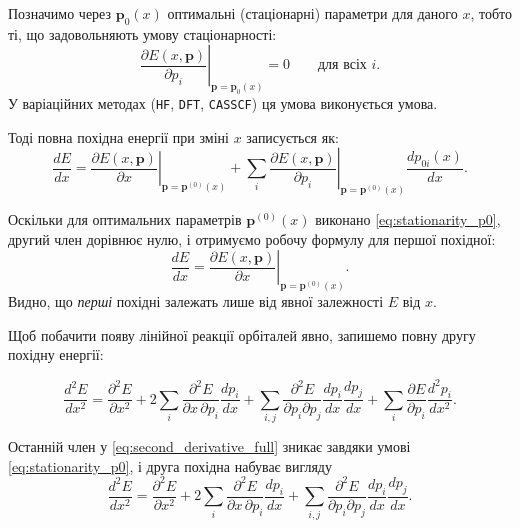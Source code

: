 \documentclass{PySCFBook}
\begin{document}
Позначимо через \(\mathbf p_0(x)\) оптимальні (стаціонарні) параметри для даного \(x\),
тобто ті, що задовольняють умову стаціонарності:
\begin{equation}
\left.\frac{\partial E(x,\mathbf p)}{\partial p_i}\right|_{\mathbf p=\mathbf p_0(x)} = 0
\qquad\text{для всіх }i.
\label{eq:stationarity_p0}
\end{equation}
У варіаційних методах (\texttt{HF}, \texttt{DFT}, \texttt{CASSCF})
ця умова виконується умова.


Тоді повна похідна енергії при зміні \(x\) записується як:
\begin{equation}
\frac{dE}{dx}
=
\left.\frac{\partial E(x,\mathbf p)}{\partial x}\right|_{\mathbf p=\mathbf p^{(0)}(x)}
+
\sum_i
\left.\frac{\partial E(x,\mathbf p)}{\partial p_i}\right|_{\mathbf p=\mathbf p^{(0)}(x)}
\frac{d p_{0i}(x)}{dx}.
\label{eq:dE_dx_general}
\end{equation}

Оскільки для оптимальних параметрів \(\mathbf p^{(0)}(x)\) виконано \eqref{eq:stationarity_p0},
другий член дорівнює нулю, і отримуємо робочу формулу для першої похідної:
\begin{equation}
\frac{dE}{dx}
=
\left.\frac{\partial E(x,\mathbf p)}{\partial x}\right|_{\mathbf p=\mathbf p^{(0)}(x)}.
\label{eq:dE_dx_stationary}
\end{equation}
Видно, що \emph{перші} похідні залежать лише від явної залежності $E$ від $x$.


Щоб побачити появу лінійної реакції орбіталей явно,
запишемо повну другу похідну енергії:

\begin{equation}
\frac{d^2E}{dx^2}
=
\frac{\partial^2 E}{\partial x^2}
+
2 \sum_i
\frac{\partial^2 E}{\partial x\,\partial p_i}\frac{dp_i}{dx}
+
\sum_{i,j}
\frac{\partial^2 E}{\partial p_i \partial p_j}
\frac{dp_i}{dx}\frac{dp_j}{dx}
+
\sum_i
\frac{\partial E}{\partial p_i}\frac{d^2 p_i}{dx^2}.
\label{eq:second_derivative_full}
\end{equation}



Останній член у \eqref{eq:second_derivative_full} зникає завдяки умові \eqref{eq:stationarity_p0}, і друга похідна набуває вигляду
\begin{equation}
\frac{d^2E}{dx^2}
=
\frac{\partial^2 E}{\partial x^2}
+
2 \sum_i
\frac{\partial^2 E}{\partial x\,\partial p_i}\frac{dp_i}{dx}
+
\sum_{i,j}
\frac{\partial^2 E}{\partial p_i \partial p_j}
\frac{dp_i}{dx}\frac{dp_j}{dx}.
\label{eq:second_derivative_simplified}
\end{equation}
\end{document}
